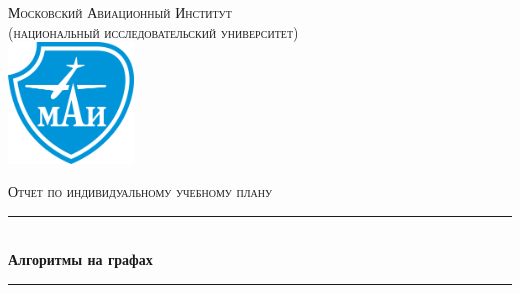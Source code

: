 \documentclass[a4paper,12pt]{article}
\begin{document}
\begin{titlepage}

\newcommand{\HRule}{\rule{\linewidth}{0.5mm}} %

\center %
 
 
 

\textsc{\large Московский Авиационный Институт\\(национальный исследовательский университет)}\\[1.5cm] %




\includegraphics[width=0.25\textwidth]{mai_logo.png}\\[1cm]
 

\vspace{40px}

\textsc{\Large Отчет по индивидуальному учебному плану}\\[0.5cm] %




\HRule \\[0.4cm]
{ \huge \bfseries Алгоритмы на графах}\\[0.4cm] %
\HRule \\[1.5cm]




\end{titlepage}
\end{document}
